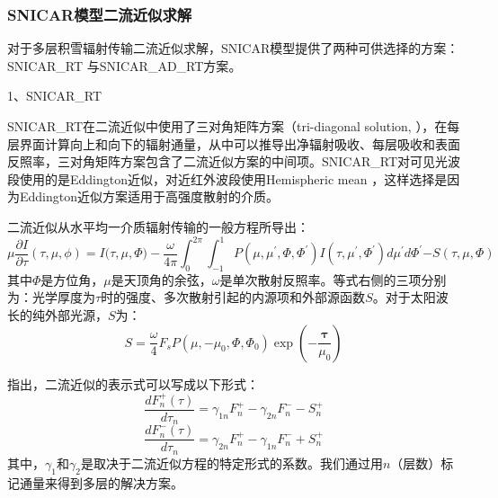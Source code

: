 \subsubsection{SNICAR模型二流近似求解}

对于多层积雪辐射传输二流近似求解，SNICAR模型提供了两种可供选择的方案：SNICAR\_RT \citep{dang2019IntercomparisonImprovementTwostream}与SNICAR\_AD\_RT方案\citep{flanner2021SNICARADv3CommunityTool}。

1、SNICAR\_RT

SNICAR\_RT在二流近似中使用了三对角矩阵方案（tri-diagonal
solution, \citet{toon1989RapidCalculationRadiative}），在每层界面计算向上和向下的辐射通量，从中可以推导出净辐射吸收、每层吸收和表面反照率，三对角矩阵方案包含了二流近似方案的中间项。SNICAR\_RT对可见光波段使用的是Eddington近似\citep{wiscombe1980ModelSpectralAlbedo}，对近红外波段使用Hemispheric mean \citep{toon1989RapidCalculationRadiative}，这样选择是因为Eddington近似方案适用于高强度散射的介质。

二流近似从水平均一介质辐射传输的一般方程所导出：
%
\begin{equation}
\mu\frac{\partial {I}}{\partial\tau}(\tau,\mu,\phi){= I(\tau,}\mu,\Phi) - \frac{\omega}{{4}{\pi}}\int_{{0}}^{{2}\pi}{\int_{- 1}^{1}{P\left( \mu,\mu^{'},\Phi,\Phi^{'} \right)}}I\left( \tau,\mu^{'},\Phi^{'} \right){d}\mu^{'}d\Phi^{'}{- S}\left( \tau,\mu,\Phi \right)
\end{equation}
%
其中\(\Phi\)是方位角，\(\mu\)是天顶角的余弦，\(\omega\)是单次散射反照率。等式右侧的三项分别为：光学厚度为\(\tau\)时的强度、多次散射引起的内源项和外部源函数$S$。对于太阳波长的纯外部光源，$S$为：
%
\begin{equation}
S = \frac{\omega}{4}F_{s}P\left( \mu,{- \mu}_{0},\Phi,\Phi_{0} \right)\exp\left( -\frac{\mathbf{\tau}}{\mu_{0}} \right)
\end{equation}

\citet{meador1980TwostreamApproximationsRadiative}指出，二流近似的表示式可以写成以下形式：
\begin{equation}
\frac{dF_{n}^{+}(\tau)}{d\tau_{n}} = \gamma_{1n}F_{n}^{+} - \gamma_{2n}F_{n}^{-} - S_{n}^{+}
\end{equation}
\begin{equation}
\frac{dF_{n}^{-}(\tau)}{d\tau_{n}} = \gamma_{2n}F_{n}^{+} - \gamma_{1n}F_{n}^{-} + S_{n}^{+}
\end{equation}
其中，\(\gamma_{1}\)和\(\gamma_{2}\)是取决于二流近似方程的特定形式的系数。我们通过用$n$（层数）标记通量来得到多层的解决方案。

